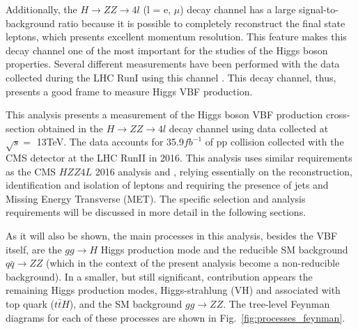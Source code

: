 Additionally, the $H \rightarrow ZZ \rightarrow 4l$ (l = e, $\mu$) decay channel has a large signal-to-background ratio because it is possible to completely reconstruct the final state leptons, which presents excellent momentum resolution. This feature makes this decay channel one of the most important for the studies of the Higgs boson properties. Several different measurements have been performed with the data collected during the LHC RunI using this channel
\cite{bib:PhysRevLett110-081803-2013,bib:PhysRevD89-092007-2014,bib:PhysLettB-736-64-2014,bib:PhysRevD92-012004-2015,bib:PhysRevD92-072010-2015}. This decay channel, thus, presents a good frame to measure Higgs VBF production.

This analysis presents a measurement of the Higgs boson VBF production cross-section obtained in the $H \rightarrow ZZ \rightarrow 4l$ decay channel using data collected at $\sqrt{s}=$ 13TeV. The data accounts for 35.9$fb^{-1}$ of pp collision collected with the CMS detector at the LHC RunII in 2016. This analysis uses similar requirements as the CMS $HZZ4L$ 2016 analysis \cite{bib:CMS-AN-16-442} and \cite{bib:CMS-AN-16-328}, relying essentially on the reconstruction, identification and isolation of leptons and requiring the presence of jets and Missing Energy Transverse (MET). The specific selection and analysis requirements will be discussed in more detail in the following sections.

As it will also be shown, the main processes in this analysis, besides the VBF itself, are the $gg \rightarrow H$ Higgs production mode and the reducible SM background $q\bar{q} \rightarrow ZZ$ (which in the context of the present analysis become a non-reducible background). In a smaller, but still significant, contribution appears the remaining Higgs production modes, Higgs-strahlung (VH) and associated with top quark ($t\bar{t}H$), and the SM background $gg \rightarrow ZZ$. The tree-level Feynman diagrams for each of these processes are shown in Fig.~\ref{fig:processes_feynman}.

